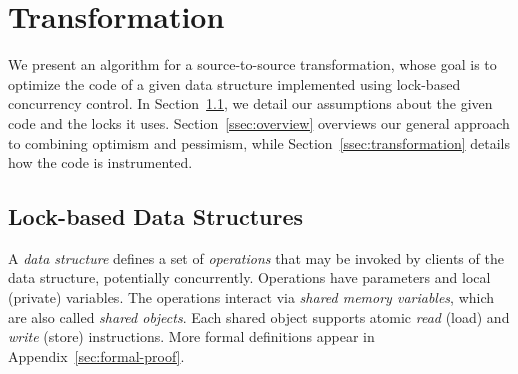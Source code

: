 \renewcommand{\ttdefault}{pcr}
\algrenewcommand{}
\algrenewcommand{}
\algrenewcommand{}
\algrenewcommand{}
\algrenewcommand{}
\algrenewcommand\textproc{\textit}
\newcommand{\codesize}{\footnotesize}



\section{Transformation}\label{sec:algorithm}

We present an algorithm for a source-to-source transformation, whose
goal is to optimize the code of a given data structure implemented using lock-based concurrency control.
In Section~\ref{ssec:locks}, we detail our assumptions about the given code and the locks it uses.
Section~\ref{ssec:overview} overviews our general approach to combining optimism and pessimism,
while
Section~\ref{ssec:transformation} details how the code is instrumented. 

\subsection{Lock-based Data Structures}\label{ssec:locks}

A \emph{data structure} defines a set of \emph{operations} that may be invoked by
clients of the data structure, potentially concurrently.
%
Operations have parameters and local (private) variables. %
%
The operations interact via \emph{shared memory variables}, which are also called \emph{shared objects}.
%
Each shared object supports atomic \emph{read} (load) and \emph{write} (store) instructions.
%
More formal definitions appear in Appendix~\ref{sec:formal-proof}. 

